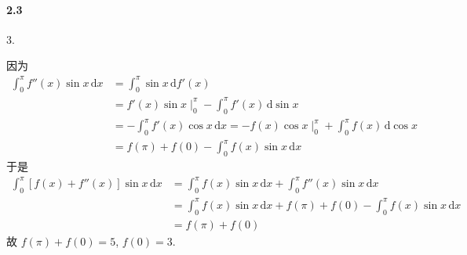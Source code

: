 \paragraph*{2.3} $3$.

因为
\[
   \begin{aligned}
\int_{0}^{\pi}f''(x)\sin x\,\mathrm dx&=\int_{0}^{\pi}\sin x\,\mathrm df'(x)\\&=f'(x)\sin x\mid_{0}^{\pi}-\int_{0}^{\pi}f'(x)\,\mathrm d\sin x\\
&=-\int_{0}^{\pi}f'(x)\cos x\,\mathrm dx=-f(x)\cos x\mid_{0}^{\pi}+\int_{0}^{\pi}f(x)\,\mathrm d\cos x\\
&=f(\pi)+f(0)-\int_{0}^{\pi}f(x)\sin x\,\mathrm dx
   \end{aligned}
\]
于是
\[
   \begin{aligned}
\int_{0}^{\pi}[f(x)+f''(x)]\sin x\,\mathrm dx&=\int_{0}^{\pi}f(x)\sin x\,\mathrm dx+\int_{0}^{\pi}f''(x)\sin x\,\mathrm dx\\
&=\int_{0}^{\pi}f(x)\sin x\,\mathrm dx +f(\pi)+f(0)-\int_{0}^{\pi}f(x)\sin x\,\mathrm dx\\&=f(\pi)+f(0)
   \end{aligned}
\]
故 $f(\pi)+f(0)=5$, $f(0)=3$.